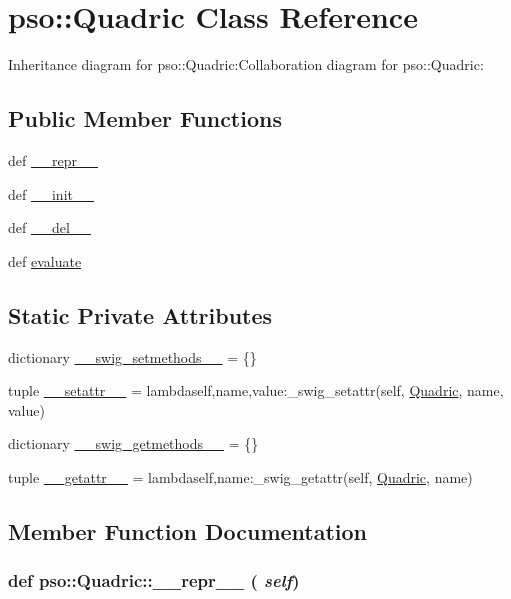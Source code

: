\hypertarget{classpso_1_1Quadric}{
\section{pso::Quadric Class Reference}
\label{classpso_1_1Quadric}
}
Inheritance diagram for pso::Quadric:Collaboration diagram for pso::Quadric:\subsection*{Public Member Functions}
\begin{CompactItemize}
\item 
def \hyperlink{classpso_1_1Quadric_c345dddcc2571f2daaf90a6ba9dcc237}{\_\-\_\-repr\_\-\_\-}
\item 
def \hyperlink{classpso_1_1Quadric_fed66f973031f5c183bbdb8ac437315c}{\_\-\_\-init\_\-\_\-}
\item 
def \hyperlink{classpso_1_1Quadric_643ec4862385919c0e08f61f356ea0e6}{\_\-\_\-del\_\-\_\-}
\item 
def \hyperlink{classpso_1_1Quadric_bf922b6bbf00b01ca2a449078ecff65a}{evaluate}
\end{CompactItemize}
\subsection*{Static Private Attributes}
\begin{CompactItemize}
\item 
dictionary \hyperlink{classpso_1_1Quadric_5953ccca68eb821e48ff2953838604b7}{\_\-\_\-swig\_\-setmethods\_\-\_\-} = \{\}
\item 
tuple \hyperlink{classpso_1_1Quadric_39d18c5e187c40c760304ac789fd813c}{\_\-\_\-setattr\_\-\_\-} = lambdaself,name,value:\_\-swig\_\-setattr(self, \hyperlink{classpso_1_1Quadric}{Quadric}, name, value)
\item 
dictionary \hyperlink{classpso_1_1Quadric_d98a08d9dc318dfb0799dc8a0f442370}{\_\-\_\-swig\_\-getmethods\_\-\_\-} = \{\}
\item 
tuple \hyperlink{classpso_1_1Quadric_099ef681ef278e6b714bc4597ea5dcca}{\_\-\_\-getattr\_\-\_\-} = lambdaself,name:\_\-swig\_\-getattr(self, \hyperlink{classpso_1_1Quadric}{Quadric}, name)
\end{CompactItemize}


\subsection{Member Function Documentation}
\hypertarget{classpso_1_1Quadric_c345dddcc2571f2daaf90a6ba9dcc237}{
\subsubsection{\setlength{\rightskip}{0pt plus 5cm}def pso::Quadric::\_\-\_\-repr\_\-\_\- ( {\em self})}}
\label{classpso_1_1Quadric_c345dddcc2571f2daaf90a6ba9dcc237}




